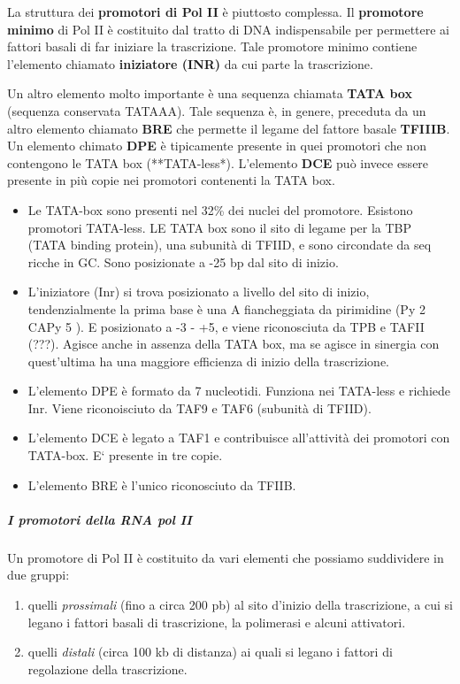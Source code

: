 \documentclass[11pt]{book}
\begin{document}
La struttura dei \textbf{promotori di Pol II} è piuttosto complessa. Il
\textbf{promotore minimo} di Pol II è costituito dal tratto di DNA
indispensabile per permettere ai fattori basali di far iniziare la
trascrizione. Tale promotore minimo contiene l'elemento chiamato
\textbf{iniziatore (INR)} da cui parte la trascrizione.

Un altro elemento molto importante è una sequenza chiamata \textbf{TATA
box} (sequenza conservata TATAAA). Tale sequenza è, in genere, preceduta
da un altro elemento chiamato \textbf{BRE} che permette il legame del
fattore basale \textbf{TFIIIB}. Un elemento chimato \textbf{DPE} è
tipicamente presente in quei promotori che non contengono le TATA box
(**TATA-less*). L'elemento \textbf{DCE} può invece essere presente in
più copie nei promotori contenenti la TATA box.

\begin{itemize}
\item
  Le TATA-box sono presenti nel 32\% dei nuclei del promotore. Esistono
  promotori TATA-less. LE TATA box sono il sito di legame per la TBP
  (TATA binding protein), una subunità di TFIID, e sono circondate da
  seq ricche in GC. Sono posizionate a -25 bp dal sito di inizio.
\item
  L'iniziatore (Inr) si trova posizionato a livello del sito di inizio,
  tendenzialmente la prima base è una A fiancheggiata da pirimidine (Py
  2 CAPy 5 ). E posizionato a -3 - +5, e viene riconosciuta da TPB e
  TAFII (???). Agisce anche in assenza della TATA box, ma se agisce in
  sinergia con quest'ultima ha una maggiore efficienza di inizio della
  trascrizione.
\item
  L'elemento DPE è formato da 7 nucleotidi. Funziona nei TATA-less e
  richiede Inr. Viene riconoisciuto da TAF9 e TAF6 (subunità di TFIID).
\item
  L'elemento DCE è legato a TAF1 e contribuisce all'attività dei
  promotori con TATA-box. E` presente in tre copie.
\item
  L'elemento BRE è l'unico riconosciuto da TFIIB.
\end{itemize}

\subparagraph{I promotori della RNA pol
II}\label{i-promotori-della-rna-pol-ii}

Un promotore di Pol II è costituito da vari elementi che possiamo
suddividere in due gruppi:

\begin{enumerate}
\def\labelenumi{\arabic{enumi}.}
\itemsep1pt\parskip0pt
\item
  quelli \emph{prossimali} (fino a circa 200 pb) al sito d'inizio della
  trascrizione, a cui si legano i fattori basali di trascrizione, la
  polimerasi e alcuni attivatori.
\item
  quelli \emph{distali} (circa 100 kb di distanza) ai quali si legano i
  fattori di regolazione della trascrizione.
\end{enumerate}
\end{document}
